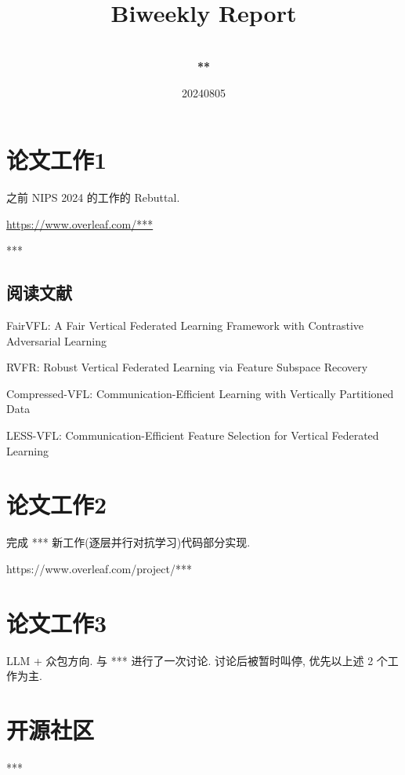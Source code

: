 \documentclass[a4paper]{article}
\title{
    \vspace*{1.0in}
     \\
    \vspace*{1in}
    \textbf{\Huge Biweekly Report}
    \vspace{0.5in}
}
\author{ \\
    \textbf{\huge ***} \\
    \vspace*{1in}
}
\date{\LARGE 20240805}
\begin{document}
\LARGE

\maketitle
\tableofcontents
\thispagestyle{empty}
\newpage

\section{论文工作1}

之前 NIPS 2024 的工作的 Rebuttal.

\url{https://www.overleaf.com/***}

***

\subsection{阅读文献}

FairVFL: A Fair Vertical Federated Learning Framework with Contrastive Adversarial Learning

RVFR: Robust Vertical Federated Learning via Feature Subspace Recovery

Compressed-VFL: Communication-Efficient Learning with Vertically Partitioned Data

LESS-VFL: Communication-Efficient Feature Selection for Vertical Federated Learning



\section{论文工作2}

完成 *** 新工作(逐层并行对抗学习)代码部分实现.

https://www.overleaf.com/project/***






\section{论文工作3}

LLM + 众包方向. 与 *** 进行了一次讨论. 讨论后被暂时叫停, 优先以上述 2 个工作为主.



\section{开源社区}

***
\end{document}
